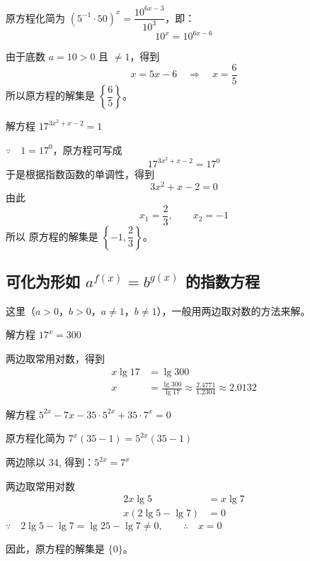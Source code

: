 \begin{solution}
原方程化简为 $(5^{-1}\cdot 50)^x=\dfrac{10^{6x-3}}{10^3}$，即：
\[10^x=10^{6x-6}\]

由于底数 $a=10>0$ 且 $\ne 1$，得到
\[x=5x-6 \quad \Rightarrow\quad x=\frac{6}{5}\]
所以原方程的解集是 $\left\{\dfrac{6}{5}\right\}$。
\end{solution}


\begin{example}
解方程 $17^{3x^2+x-2}=1$
\end{example}

\begin{solution}
$\because\quad 1=17^0$，原方程可写成
\[17^{3x^2+x-2}=17^{0}\]
于是根据指数函数的单调性，得到
\[3x^2+x-2=0\]
由此
\[x_1=\frac{2}{3},\qquad x_2=-1\]
所以 原方程的解集是 $\left\{-1,\dfrac{2}{3}\right\}$。
\end{solution}

\subsection{可化为形如 $a^{f(x)}=b^{g(x)}$ 的指数方程}
这里（$a>0$，$b>0$，$a\ne 1$，$b\ne 1$），一般用两边取对数的方法来解。

\begin{example}
解方程 $17^x=300$
\end{example}

\begin{solution}
两边取常用对数，得到
\[\begin{split}
  x\lg17&=\lg300\\
  x&=\frac{\lg300}{\lg 17}\approx \frac{2.4771}{1.2304}\approx 2.0132
\end{split}\]  
\end{solution}  
  
\begin{example}
  解方程 $5^{2x}-7x-35\cdot 5^{2x}+35\cdot 7^x=0$
\end{example}

\begin{solution}
原方程化简为 $7^x (35-1)=5^{2x}(35-1)$

两边除以 34, 得到：$5^{2x}=7^x$

两边取常用对数
\[\begin{split}
  2x\lg5&=x\lg7\\
x(2\lg5-\lg7)&=0
\end{split} \]
$\because\quad   2\lg5-\lg7=\lg25-\lg7\ne 0,\qquad \therefore\quad x=0$

因此，原方程的解集是 $\{0\}$。
\end{solution}

